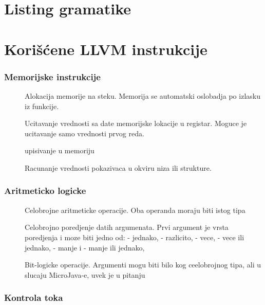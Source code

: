 
\appendix

\chapter{Listing gramatike}
\lstset{
  basicstyle=\footnotesize
}



\chapter{Korišćene LLVM instrukcije}

\subsection*{Memorijske instrukcije}

\begin{description}
\item[] Alokacija memorije na steku. Memorija se automatski oslobadja po izlasku iz funkcije.
\item[] Ucitavanje vrednosti sa date memorijske lokacije u registar. Moguce je ucitavanje samo vrednosti prvog reda.
\item[] upisivanje u memoriju
\item[] Racunanje vrednosti pokazivaca u okviru niza ili strukture.
\end{description}

\subsection*{Aritmeticko logicke}

\begin{description}
\item[] Celobrojne aritmeticke operacije. Oba operanda moraju biti istog tipa
\item[] Celobrojno poredjenje datih argumenata. Prvi argument je vrsta poredjenja i moze biti
jedno od:  - jednako,   - razlicito,  - vece,  - vece ili jednako,   - manje i   - manje ili jednako, 
\item[] Bit-logicke operacije. Argumenti mogu biti bilo kog ceelobrojnog tipa, ali u slucaju MicroJava-e, uvek je u pitanju 
\end{description}

\subsection*{Kontrola toka}

